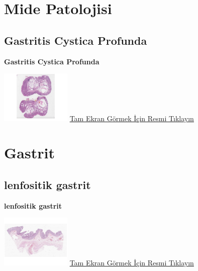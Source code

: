 \documentclass[
  letterpaper,
  DIV=11,
  numbers=noendperiod]{scrreprt}
\begin{document}
\hypertarget{sec-mide-patolojisi}{%
\chapter{Mide Patolojisi}\label{sec-mide-patolojisi}}

\hypertarget{sec-gastritis-cystica-profunda}{%
\section{Gastritis Cystica
Profunda}\label{sec-gastritis-cystica-profunda}}

\textbf{Gastritis Cystica Profunda}

\href{https://images.patolojiatlasi.com/gastritis-cystica-profunda/HE.html}{\includegraphics[width=0.25\textwidth,height=\textheight]{./screenshots/thumbnail_gastritis-cystica-profunda.png}}
\href{https://images.patolojiatlasi.com/gastritis-cystica-profunda/HE.html}{Tam
Ekran Görmek İçin Resmi Tıklayın}

\hypertarget{sec-gastrit}{%
\chapter{Gastrit}\label{sec-gastrit}}

\hypertarget{sec-lymphocytic-gastritis}{%
\section{lenfositik gastrit}\label{sec-lymphocytic-gastritis}}

\textbf{lenfositik gastrit}

\href{https://images.patolojiatlasi.com/lymphocytic-gastritis/all.html}{\includegraphics[width=0.25\textwidth,height=\textheight]{./screenshots/thumbnail_lymphocytic-gastritis-all.png}}
\href{https://images.patolojiatlasi.com/lymphocytic-gastritis/all.html}{Tam
Ekran Görmek İçin Resmi Tıklayın}
\end{document}
